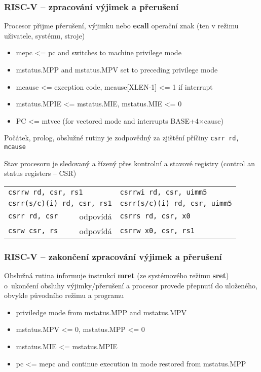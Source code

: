 \documentclass{beamer}
\begin{document}
\begin{frame}
\frametitle{RISC-V -- zpracování výjimek a přerušení}

Procesor přijme přerušení, výjimku nebo \textbf{ecall} operační znak (ten v režimu uživatele, systému, stroje)

\begin{itemize}
 \item mepc <= pc and switches to machine privilege mode
 \item mstatus.MPP and mstatus.MPV set to preceding privilege mode
 \item mcause <= exception code, mcause[XLEN-1] <= 1 if interrupt
 \item mstatus.MPIE <= mstatus.MIE, mstatus.MIE <= 0
 \item PC <= mtvec (for vectored mode and interrupts BASE+4×cause)
\end{itemize}

Počátek, prolog, obslužné rutiny je zodpovědný za zjištění příčiny \texttt{csrr rd, mcause}

Stav procesoru je sledovaný a řízený přes kontrolní a stavové registry (control an status registers -- CSR)

\begin{tabular}{l r l}
\multicolumn{2}{l}{\texttt{csrrw rd, csr, rs1}} & \texttt{csrrwi rd, csr, uimm5} \\
\multicolumn{2}{l}{\texttt{csrr(s/c)(i) rd, csr, rs1}}  & \texttt{csrr(s/c)(i) rd, csr, uimm5} \\
\texttt{csrr rd, csr} &  odpovídá  & \texttt{csrrs rd, csr, x0} \\
\texttt{csrw csr, rs} &  odpovídá  & \texttt{csrrw x0, csr, rs1} \\
\end{tabular}
\end{frame}

\begin{frame}
\frametitle{RISC-V -- zakončení zpracování výjimek a přerušení}

Obslužná rutina informuje instrukcí \textbf{mret} (ze systémového režimu \textbf{sret})
o~ukončení obsluhy výjimky/přerušení a procesor provede přepnutí do uloženého, obvykle původního
režimu a programu

\begin{itemize}
 \item priviledge mode from mstatus.MPP and mstatus.MPV
 \item mstatus.MPV <= 0, mstatus.MPP <= 0
 \item mstatus.MIE <= mstatus.MPIE
 \item pc <= mepc and continue execution in mode restored from mstatus.MPP
\end{itemize}
\end{frame}
\end{document}
